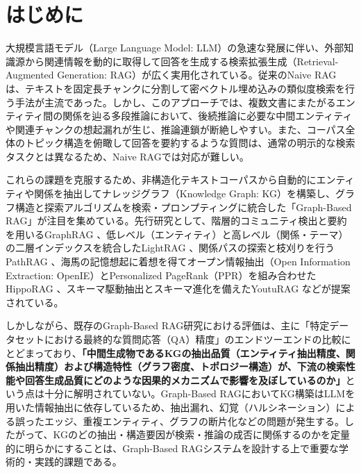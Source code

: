 \documentclass[a4j,dvipdfmx]{jsarticle}
\begin{document}
\pagestyle{plain}
\maketitle

\section{はじめに}

大規模言語モデル（Large Language Model: LLM）の急速な発展に伴い、外部知識源から関連情報を動的に取得して回答を生成する検索拡張生成（Retrieval-Augmented Generation: RAG）\cite{lewis2020rag}が広く実用化されている。従来のNaive RAGは、テキストを固定長チャンクに分割して密ベクトル埋め込みの類似度検索を行う手法が主流であった。しかし、このアプローチでは、複数文書にまたがるエンティティ間の関係を辿る多段推論において、後続推論に必要な中間エンティティや関連チャンクの想起漏れが生じ、推論連鎖が断絶しやすい\cite{qi-etal-2019-answering,zhu-etal-2025-mitigating,sarthi2024raptor}。また、コーパス全体のトピック構造を俯瞰して回答を要約するような質問は、通常の明示的な検索タスクとは異なるため、Naive RAGでは対応が難しい\cite{edge2024graphrag}。

これらの課題を克服するため、非構造化テキストコーパスから自動的にエンティティや関係を抽出してナレッジグラフ（Knowledge Graph: KG）を構築し、グラフ構造と探索アルゴリズムを検索・プロンプティングに統合した「Graph-Based RAG」が注目を集めている。先行研究として、階層的コミュニティ検出と要約を用いるGraphRAG \cite{edge2024graphrag}、低レベル（エンティティ）と高レベル（関係・テーマ）の二層インデックスを統合したLightRAG \cite{guo2024lightrag}、関係パスの探索と枝刈りを行うPathRAG \cite{chen2024pathrag}、海馬の記憶想起に着想を得てオープン情報抽出（Open Information Extraction: OpenIE）とPersonalized PageRank（PPR）を組み合わせたHippoRAG \cite{gutierrez2024hipporag}、スキーマ駆動抽出とスキーマ進化を備えたYoutuRAG \cite{dong2025youtu}などが提案されている\cite{pan2024unifying}。

しかしながら、既存のGraph-Based RAG研究における評価は、主に「特定データセットにおける最終的な質問応答（QA）精度」のエンドツーエンドの比較にとどまっており、\textbf{「中間生成物であるKGの抽出品質（エンティティ抽出精度、関係抽出精度）および構造特性（グラフ密度、トポロジー構造）が、下流の検索性能や回答生成品質にどのような因果的メカニズムで影響を及ぼしているのか」}という点は十分に解明されていない。Graph-Based RAGにおいてKG構築はLLMを用いた情報抽出に依存しているため、抽出漏れ、幻覚（ハルシネーション）による誤ったエッジ、重複エンティティ、グラフの断片化などの問題が発生する。したがって、KGのどの抽出・構造要因が検索・推論の成否に関係するのかを定量的に明らかにすることは、Graph-Based RAGシステムを設計する上で重要な学術的・実践的課題である。
\end{document}
